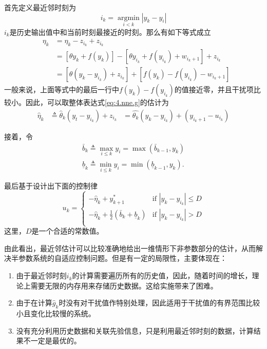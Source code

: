 首先定义最近邻时刻为
\begin{equation}\label{eq:4.it}
i_k=\mathop{\arg \min}\limits_{i<k}|y_k-y_i|
\end{equation}
$i_k$是历史输出值中和当前时刻最接近的时刻。那么有如下等式成立
\begin{equation*}
\begin{array}{lll}
&\eta_k&=\eta_k-z_{i_k}+z_{i_k}\\
&&=[\theta y_k+f(y_k)]-[\theta y_{i_k}+f(y_{i_k})+w_{i_k+1}]+z_{i_k}\\
&&=[\theta(y_k-y_{i_k})+z_{i_k}]+[f(y_k)-f(y_{i_k})-w_{i_k+1}]
\end{array}
\end{equation*}
一般来说，上面等式中的最后一行中$f(y_k)-f(y_{i_k})$的值接近零，并且干扰项比较小。因此，可以取整体表达式\eqref{eq:4.nne.g}的估计为
\begin{equation}\label{eq.4:g.est}
\begin{array}{lll}
\hat{\eta}_k&\triangleq\hat{\theta}_k(y_t-y_{i_k})+z_{i_k}
&=\hat{\theta_k}(y_k-y_{i_k})+(y_{i_k+1}-u_{i_k})
\end{array}
\end{equation}

接着，令
\begin{equation}\label{eq.4:bk}
\begin{array}{lll}
\bar{b}_k\triangleq \max\limits_{i\leq k}y_i
         =\max(\bar{b}_{k-1}, y_k)\\
\underline{b}_k\triangleq \min\limits_{i\leq k}{y_i}
                =\min(\underline{b}_{k-1}, y_k).
\end{array} 
\end{equation}

最后基于设计出下面的控制律
\begin{equation}\label{eq:4.uk}
u_{k}=\left\{
\begin{array}{cc}
  -\hat \eta_k+y_{k+1}^* & \text{if } |y_k-y_{i_k}|\le D \\
  -\hat \eta_k+\frac12(\bar b_k+\underline b_k) & \text{if } |y_k-y_{i_k}|> D \\
\end{array}
\right.
\end{equation}
这里，$D$是一个合适的常数值。

由此看出，最近邻估计可以比较准确地给出一维情形下非参数部分的估计，从而解决半参数系统的自适应控制问题。但是有一定的局限性，主要体现在：
\begin{enumerate}
\item 由于最近邻时刻$i_k$的计算需要遍历所有的历史值，因此，随着时间的增长，理论上需要无限的内存用来存储历史数据。这给实施带来了困难。
\item 由于在计算$\hat{g}_k$时没有对干扰值作特别处理，因此适用于干扰值的有界范围比较小且变化比较慢的系统。
\item 没有充分利用历史数据和关联先验信息，只是利用最近邻时刻的数据，计算结果不一定是最优的。
\end{enumerate}


